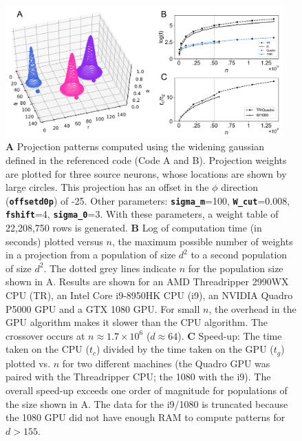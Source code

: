 \documentclass[12pt, a4paper]{article}
\newcommand{\code}[1]{\textbf{\texttt{#1}}}
\begin{document}
\begin{figure}[h!]
\includegraphics[width=0.95\textwidth]{./fig1.png}
\caption{\textbf{A} Projection patterns computed using the widening gaussian
defined in the referenced code (Code A and B). Projection weights are plotted for three source
neurons, whose locations are shown by large circles. This projection has an
offset in the $\phi$ direction (\code{offsetd0p}) of -25. Other parameters:
\code{sigma\_m}=100, \code{W\_cut}=0.008, \code{fshift}=4, \code{sigma\_0}=3. With
these parameters, a weight table of 22,208,750 rows is generated.
%
\textbf{B}
Log of computation time (in seconds) plotted versus $n$, the maximum possible
number of weights in a projection from a population of size $d^2$ to a second
population of size $d^2$. The dotted grey lines indicate $n$ for the
population size shown in A. Results are shown for an AMD Threadripper 2990WX
CPU (TR), an Intel Core i9-8950HK CPU (i9), an NVIDIA Quadro P5000 GPU and a
GTX 1080 GPU. For small $n$, the overhead in the GPU algorithm makes it slower
than the CPU algorithm. The crossover occurs at $n\approx1.7\times10^6$
($d\approx64$).
%
\textbf{C} Speed-up: The time taken on the CPU ($t_c$) divided by the
time taken on the GPU ($t_g$) plotted vs. $n$ for two different machines (the
Quadro GPU was paired with the Threadripper CPU; the 1080 with the i9). The
overall speed-up exceeds one order of magnitude for populations of the size
shown in A. The data for the i9/1080 is truncated because the 1080 GPU did not
have enough RAM to compute patterns for $d>155$.}
\vspace{-10pt}
\label{f1}
\end{figure}
\end{document}
